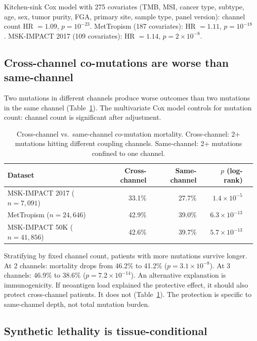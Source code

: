 \documentclass[11pt]{article}
\begin{document}
Kitchen-sink Cox model with 275 covariates (TMB, MSI, cancer type,
subtype, age, sex, tumor purity, FGA, primary site, sample type,
panel version): channel count HR $= 1.09$, $p = 10^{-23}$.
MetTropism (187 covariates): HR $= 1.11$, $p = 10^{-18}$.
MSK-IMPACT 2017 (109 covariates): HR $= 1.14$, $p = 2 \times
10^{-8}$.

\subsection*{Cross-channel co-mutations are worse than same-channel}

Two mutations in different channels produce worse outcomes than
two mutations in the same channel (Table~\ref{tab:cross-channel}).
The multivariate Cox model controls for mutation count: channel
count is significant after adjustment.

\begin{table}[ht]
\centering
\small
\caption{Cross-channel vs.\ same-channel co-mutation mortality.
Cross-channel: 2+ mutations hitting different coupling channels.
Same-channel: 2+ mutations confined to one channel.}
\label{tab:cross-channel}
\begin{tabular}{@{}lrrrl@{}}
\toprule
Dataset & Cross-channel & Same-channel & $p$ (log-rank) \\
\midrule
MSK-IMPACT 2017 ($n=7{,}091$) & 33.1\% & 27.7\% &
  $1.4 \times 10^{-5}$ \\
MetTropism ($n=24{,}646$) & 42.9\% & 39.0\% &
  $6.3 \times 10^{-13}$ \\
MSK-IMPACT 50K ($n=41{,}856$) & 42.6\% & 39.7\% &
  $5.7 \times 10^{-13}$ \\
\bottomrule
\end{tabular}
\end{table}

Stratifying by fixed channel count, patients with more mutations
survive longer. At 2 channels: mortality drops from 46.2\% to
41.2\% ($p = 3.1 \times 10^{-8}$). At 3 channels: 46.9\% to
38.6\% ($p = 7.2 \times 10^{-14}$). An alternative explanation is
immunogenicity. If neoantigen load explained the protective effect,
it should also protect cross-channel patients. It does not
(Table~\ref{tab:cross-channel}). The protection is specific to
same-channel depth, not total mutation burden.

\subsection*{Synthetic lethality is tissue-conditional}
\end{document}

